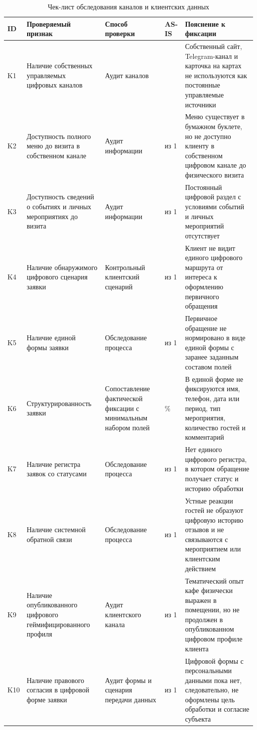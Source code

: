 \begin{table}[H]
\centering
\footnotesize
\caption{Чек-лист обследования каналов и клиентских данных}
\label{tab:app_channel_audit}
\setlength{\tabcolsep}{3pt}
\begin{tabularx}{\textwidth}{|>{\raggedright\arraybackslash}p{}|>{\raggedright\arraybackslash}p{}|>{\raggedright\arraybackslash}p{}|>{\centering\arraybackslash}p{}|>{\raggedright\arraybackslash}X|}
\hline
\textbf{ID} & \textbf{Проверяемый признак} & \textbf{Способ проверки} & \textbf{AS-IS} & \textbf{Пояснение к фиксации} \\ \hline
K1 & Наличие собственных управляемых цифровых каналов & Аудит каналов & 0 & Собственный сайт, Telegram-канал и карточка на картах не используются как постоянные управляемые источники \\ \hline
K2 & Доступность полного меню до визита в собственном канале & Аудит информации & 0 из 1 & Меню существует в бумажном буклете, но не доступно клиенту в собственном цифровом канале до физического визита \\ \hline
K3 & Доступность сведений о событиях и личных мероприятиях до визита & Аудит информации & 0 из 1 & Постоянный цифровой раздел с условиями событий и личных мероприятий отсутствует \\ \hline
K4 & Наличие обнаружимого цифрового сценария заявки & Контрольный клиентский сценарий & 0 из 1 & Клиент не видит единого цифрового маршрута от интереса к оформлению первичного обращения \\ \hline
K5 & Наличие единой формы заявки & Обследование процесса & 0 из 1 & Первичное обращение не нормировано в виде единой формы с заранее заданным составом полей \\ \hline
K6 & Структурированность заявки & Сопоставление фактической фиксации с минимальным набором полей & 0\% & В единой форме не фиксируются имя, телефон, дата или период, тип мероприятия, количество гостей и комментарий \\ \hline
K7 & Наличие регистра заявок со статусами & Обследование процесса & 0 из 1 & Нет единого цифрового регистра, в котором обращение получает статус и историю обработки \\ \hline
K8 & Наличие системной обратной связи & Обследование процесса & 0 из 1 & Устные реакции гостей не образуют цифровую историю отзывов и не связываются с мероприятием или клиентским действием \\ \hline
K9 & Наличие опубликованного цифрового геймифицированного профиля & Аудит клиентского канала & 0 из 1 & Тематический опыт кафе физически выражен в помещении, но не продолжен в опубликованном цифровом профиле клиента \\ \hline
K10 & Наличие правового согласия в цифровой форме заявки & Аудит формы и сценария передачи данных & 0 из 1 & Цифровой формы с персональными данными пока нет, следовательно, не оформлены цель обработки и согласие субъекта \\ \hline
\end{tabularx}
\normalsize
\end{table}

